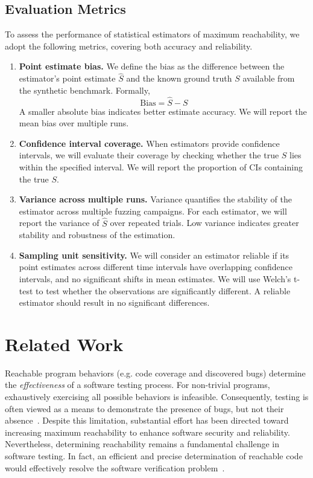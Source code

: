 \documentclass[conference,anonymous,review]{IEEEtran}
\begin{document}
\subsection{Evaluation Metrics}
To assess the performance of statistical estimators of maximum reachability, we adopt
the following metrics, covering both accuracy and reliability.
\begin{enumerate}
\item \textbf{Point estimate bias.} We define the bias as the difference between the estimator's
point estimate $\hat{S}$ and the known ground truth $S$ available from the synthetic benchmark.
Formally,
\begin{equation}
\text{Bias} = \hat{S} - S
\end{equation}
A smaller absolute bias indicates better estimate accuracy. We will report the mean bias over
multiple runs.
\item \textbf{Confidence interval coverage.} When estimators provide confidence intervals, we will evaluate their coverage by checking whether the true $S$ lies within the specified interval. We will report the proportion of CIs containing the true $S$.
\item \textbf{Variance across multiple runs.} Variance quantifies the stability of the
estimator across multiple fuzzing campaigns. For each estimator, we will report the variance
of $\hat{S}$ over repeated trials. Low variance indicates greater stability and robustness of the estimation.
\item\textbf{Sampling unit sensitivity.} We will consider an estimator reliable if its
point estimates across different time intervals have overlapping confidence intervals, and
no significant shifts in mean estimates. We will use Welch's t-test to test whether the 
observations are significantly different. A reliable estimator should result in no significant
differences.
\end{enumerate}


\section{Related Work}
\label{sec:related}

Reachable program behaviors (e.g. code coverage and discovered bugs) determine the \emph{effectiveness} of a software testing process. For non-trivial programs, exhaustively exercising all possible behaviors is infeasible. Consequently, testing is often viewed as a means to demonstrate the presence of bugs, but not their absence~\cite{dijkstra2022reliability}. Despite this limitation, substantial effort has been directed toward increasing maximum reachability to enhance software security and reliability. Nevertheless, determining reachability remains a fundamental challenge in software testing. In fact, an efficient and precise determination of reachable code would effectively resolve the software verification problem~\cite{liyanage2023reachable}. 
\end{document}
